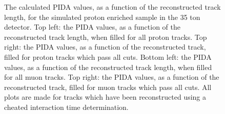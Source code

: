 \begin{figure}
\begin{subfigure}{0.48\textwidth}
        \label{fig:CRY_PIDATrLen_Muon_End}
  \end{subfigure}
  \caption[The calculated PIDA values, as a function of the reconstructed track length, for the simulated proton enriched sample in the 35 ton detector]
          {The calculated PIDA values, as a function of the reconstructed track length, for the simulated proton enriched sample in the 35 ton detector. Top left: the PIDA values, as a function of the reconstructed track length, when filled for all proton tracks. Top right: the PIDA values, as a function of the reconstructed track, filled for proton tracks which pass all cuts. Bottom left: the PIDA values, as a function of the reconstructed track length, when filled for all muon tracks. Top right: the PIDA values, as a function of the reconstructed track, filled for muon tracks which pass all cuts. All plots are made for tracks which have been reconstructed using a cheated interaction time determination.}
  \label{fig:CRY_PIDATrLen_PIDA}
\end{figure}

